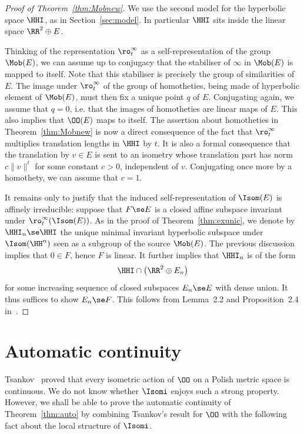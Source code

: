 \begin{proof}[Proof of Theorem~\ref{thm:Mobnew}]
We use the second model for the hyperbolic space $\HHI$, as in Section~\ref{sec:model}. In particular $\HHI$ sits inside the linear space $\RR^2\oplus E$.

Thinking of the representation $\ro^\infty_t$ as a self-representation of the group $\Mob(E)$, we can assume up to conjugacy that the stabiliser of $\infty$ in $\Mob(E)$ is mapped to itself. Note that this stabiliser is precisely the group of similarities of $E$. The image under $\ro^\infty_t$ of the group of homotheties, being made of hyperbolic element of $\Mob(E)$, must then fix a unique point $q$ of $E$. Conjugating again, we assume that $q=0$, i.e. that the images of homotheties are linear maps of $E$. This also implies that $\OO(E)$ maps to itself. The assertion about homotheties in Theorem~\ref{thm:Mobnew} is now a direct consequence of the fact that $\ro^\infty_t$ multiplies translation lengths in $\HHI$ by $t$. It is also a formal consequence that the translation by $v\in E$ is sent to an isometry whose translation part has norm $c\| v\|^t$ for some constant $c>0$, independent of $v$. Conjugating once more by a homothety, we can assume that $c=1$.

It remains only to justify that the induced self-representation of $\Isom(E)$ is affinely irreducible: suppose that $F\se E$ is a closed affine subspace invariant under $\ro^\infty_t(\Isom(E))$. As in the proof of Theorem~\ref{thm:exunic}, we denote by $\HHI_n\se \HHI$ the unique minimal invariant hyperbolic subspace under $\Isom(\HH^n)$ seen as a subgroup of the source $\Mob(E)$. The previous discussion implies that $0\in F$, hence $F$ is linear. It further implies that $\HHI_n$ is of the form
\[
\HHI\cap \left(\RR^2\oplus E_n\right)
\]
for some increasing sequence of closed subspaces $E_n \se E$ with dense union. It thus suffices to show $E_n\se F$. This follows from Lemma~2.2 and Proposition~2.4 in~\cite{Monod-Py}.
\end{proof}


\section{Automatic continuity}\label{sec:auto}

Tsankov~\cite{Tsankov13} proved that every isometric action of $\OO$ on a Polish metric space is continuous. We do not know whether $\Isomi$ enjoys such a strong property. However, we shall be able to prove the automatic continuity of Theorem~\ref{thm:auto} by combining Tsankov's result for $\OO$ with the following fact about the local structure of $\Isomi$.

